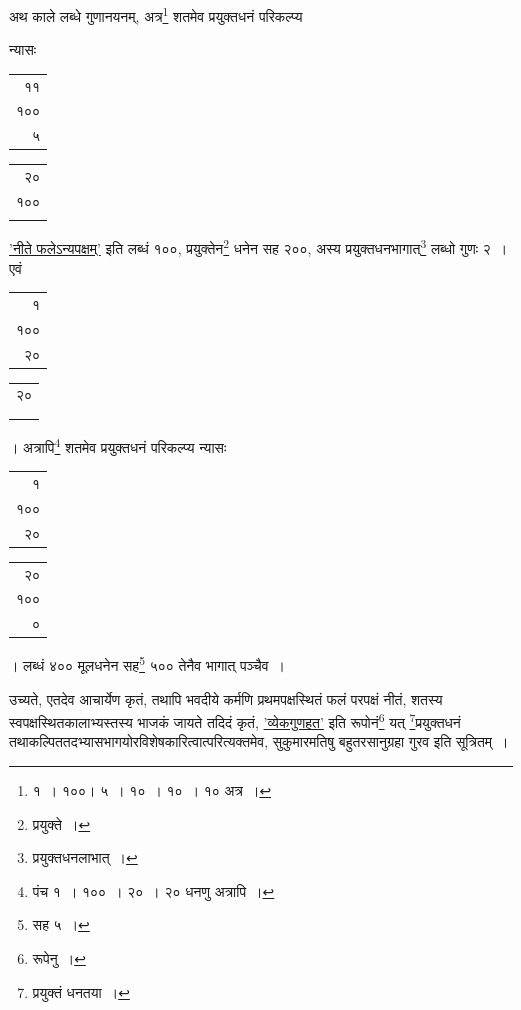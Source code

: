 \documentclass[10pt, openany]{book}
\begin{document}
{{{{{अथ काले लब्धे गुणानयनम्, अत्र\renewcommand{\thefootnote}{\s ४}\footnote{\s  १~। १००। ५~। १०~। १०~। १० अत्र~।} शतमेव प्रयुक्तधनं परिकल्प्य}
{न्यासः\textendash \begin{tabular}{r|}११	\\१०० \\५\end{tabular}\begin{tabular}{r} २०\\१०० \\ \\ \end{tabular} \hyperref[45]{'नीते फलेऽन्यपक्षम्'} इति लब्धं १००, प्रयुक्तेन\renewcommand{\thefootnote}{\s ५}\footnote{\s प्रयुक्ते~।} धनेन सह
२००, अस्य प्रयुक्तधनभागात्\renewcommand{\thefootnote}{\s ६}\footnote{\s प्रयुक्तधनलाभात्~।}  लब्धो गुणः २~। एवं \begin{tabular}{r|}१\\१००\\२०\end{tabular}\begin{tabular}{r} २०\\ \\ \\ \end{tabular}। अत्रापि\renewcommand{\thefootnote}{\s ७}\footnote{\s  पंच १~। १००~। २०~। २०
धनणु अत्रापि~।}  शतमेव
प्रयुक्तधनं परिकल्प्य न्यासः}
{\begin{tabular}{r|}१\\१००\\२०\end{tabular}\begin{tabular}{r} २०\\१००\\ ० \end{tabular}। लब्धं ४०० मूलधनेन सह\renewcommand{\thefootnote}{\s ८}\footnote{\s सह ५~।}  ५०० तेनैव भागात् पञ्चैव~।}


{उच्यते, एतदेव आचार्येण कृतं, तथापि भवदीये कर्मणि प्रथमपक्षस्थितं फलं
परपक्षं नीतं,}
{शतस्य स्वपक्षस्थितकालाभ्यस्तस्य भाजकं जायते तदिदं कृतं, \hyperref[52.1]{'व्येकगुणहत'} इति रूपोनं\renewcommand{\thefootnote}{\s १०}\footnote{\s रूपेनु~।} यत्}
{\renewcommand{\thefootnote}{\s ११}\footnote{\s प्रयुक्तं धनतया~।}प्रयुक्तधनं तथाकल्पिततदभ्यासभागयोरविशेषकारित्वात्परित्यक्तमेव,
सुकुमारमतिषु बहुतरसानुग्रहा गुरव इति सूत्रितम्~।}

}}}}
\end{document}
